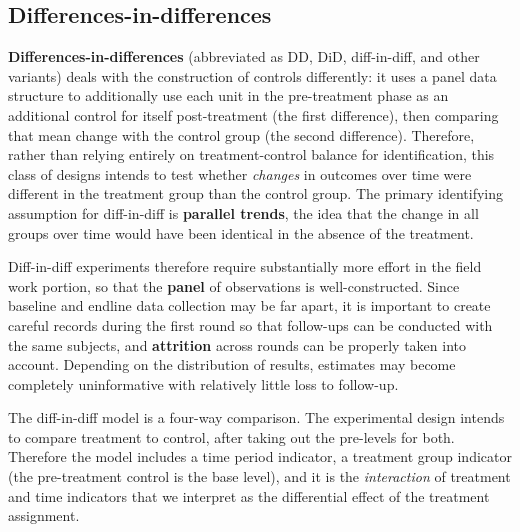 \subsection{Differences-in-differences}

\textbf{Differences-in-differences}
(abbreviated as DD, DiD, diff-in-diff, and other variants)
deals with the construction of controls differently:
it uses a panel data structure to additionally use each
unit in the pre-treatment phase as an additional control for itself post-treatment (the first difference),
then comparing that mean change with the control group (the second difference).\cite{mckenzie2012beyond}
Therefore, rather than relying entirely on treatment-control balance for identification,
this class of designs intends to test whether \textit{changes}
in outcomes over time were different in the treatment group than the control group.
The primary identifying assumption for diff-in-diff is \textbf{parallel trends},
the idea that the change in all groups over time would have been identical
in the absence of the treatment.

Diff-in-diff experiments therefore require substantially more effort
in the field work portion, so that the \textbf{panel} of observations is well-constructed.
Since baseline and endline data collection may be far apart,
it is important to create careful records during the first round
so that follow-ups can be conducted with the same subjects,
and \textbf{attrition} across rounds can be properly taken into account.
Depending on the distribution of results,
estimates may become completely uninformative
with relatively little loss to follow-up.

The diff-in-diff model is a four-way comparison.
The experimental design intends to compare treatment to control,
after taking out the pre-levels for both.
Therefore the model includes a time period indicator,
a treatment group indicator (the pre-treatment control is the base level),
and it is the \textit{interaction} of treatment and time indicators
that we interpret as the differential effect of the treatment assignment.

